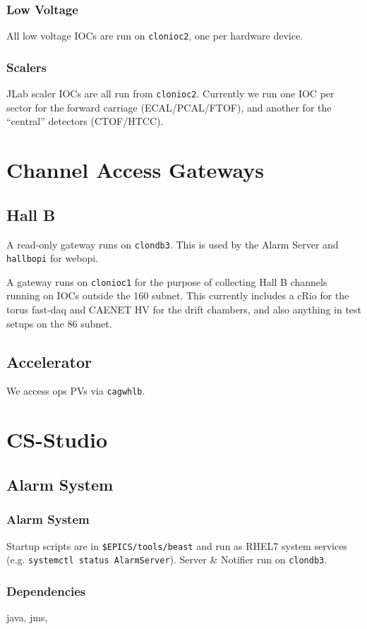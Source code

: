 \documentclass[amsmath,amssymb,notitlepage,11pt]{revtex4}
\begin{document}
\subsubsection{Low Voltage}
All low voltage IOCs are run on \texttt{clonioc2}, one per hardware device.
\subsubsection{Scalers}
JLab scaler IOCs are all run from \texttt{clonioc2}.  Currently we run one IOC per sector for the forward carriage (ECAL/PCAL/FTOF), and another for the ``central'' detectors (CTOF/HTCC).

\section{Channel Access Gateways}
\subsection{Hall B}
A read-only gateway runs on \texttt{clondb3}.  This is used by the Alarm Server and \texttt{hallbopi} for webopi.

A gateway runs on \texttt{clonioc1} for the purpose of collecting Hall B channels running on IOCs outside the 160 subnet.  This currently includes a cRio for the torus fast-daq and CAENET HV for the drift chambers, and also anything in test setups on the 86 subnet.
\subsection{Accelerator}
We access ops PVs via \texttt{cagwhlb}.

\section{CS-Studio}
\subsection{Alarm System}
\subsubsection{Alarm System}
Startup scripts are in \texttt{\$EPICS/tools/beast} and run as RHEL7 system services (e.g. \texttt{systemctl status AlarmServer}).  Server \& Notifier run on \texttt{clondb3}.
\subsubsection{Dependencies}
java, jms, 
\end{document}
